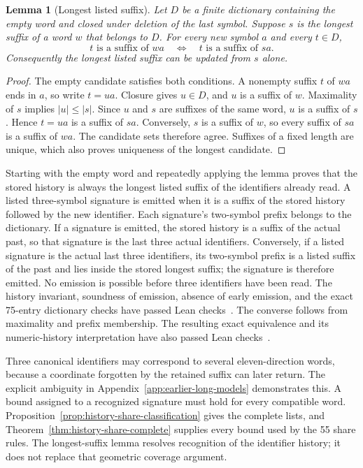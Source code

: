 \documentclass[11pt,a4paper]{article}
\newtheorem{lemma}[theorem]{Lemma}
\theoremstyle{definition}
\theoremstyle{remark}
\begin{document}
\begin{lemma}[Longest listed suffix]\label{lem:longest-suffix}
Let $D$ be a finite dictionary containing the empty word and closed under deletion of the last symbol. Suppose $s$ is the longest suffix of a word $w$ that belongs to $D$. For every new symbol $a$ and every $t\in D$,
\[
t\text{ is a suffix of }wa
\quad\Longleftrightarrow\quad
t\text{ is a suffix of }sa.
\]
Consequently the longest listed suffix can be updated from $s$ alone.
\end{lemma}
\begin{proof}
The empty candidate satisfies both conditions. A nonempty suffix $t$ of $wa$ ends in $a$, so write $t=ua$. Closure gives $u\in D$, and $u$ is a suffix of $w$. Maximality of $s$ implies $|u|\le|s|$. Since $u$ and $s$ are suffixes of the same word, $u$ is a suffix of $s$. Hence $t=ua$ is a suffix of $sa$. Conversely, $s$ is a suffix of $w$, so every suffix of $sa$ is a suffix of $wa$. The candidate sets therefore agree. Suffixes of a fixed length are unique, which also proves uniqueness of the longest candidate.
\end{proof}

Starting with the empty word and repeatedly applying the lemma proves that the stored history is always the longest listed suffix of the identifiers already read. A listed three-symbol signature is emitted when it is a suffix of the stored history followed by the new identifier. Each signature's two-symbol prefix belongs to the dictionary. If a signature is emitted, the stored history is a suffix of the actual past, so that signature is the last three actual identifiers. Conversely, if a listed signature is the actual last three identifiers, its two-symbol prefix is a listed suffix of the past and lies inside the stored longest suffix; the signature is therefore emitted. No emission is possible before three identifiers have been read. The history invariant, soundness of emission, absence of early emission, and the exact 75-entry dictionary checks have passed Lean checks~\cite{historyarchive}. The converse follows from maximality and prefix membership. The resulting exact equivalence and its numeric-history interpretation have also passed Lean checks~\cite{interfacearchive}.

Three canonical identifiers may correspond to several eleven-direction words, because a coordinate forgotten by the retained suffix can later return. The explicit ambiguity in Appendix~\ref{app:earlier-long-models} demonstrates this. A bound assigned to a recognized signature must hold for every compatible word. Proposition~\ref{prop:history-share-classification} gives the complete lists, and Theorem~\ref{thm:history-share-complete} supplies every bound used by the 55 share rules. The longest-suffix lemma resolves recognition of the identifier history; it does not replace that geometric coverage argument.
\end{document}
